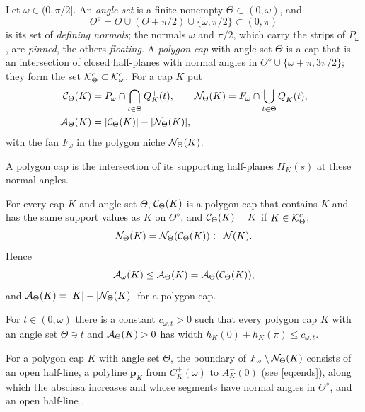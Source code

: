\begin{definition}\label{def:polygon}
Let $\omega\in(0,\pi/2]$. An \emph{angle set} is a finite nonempty
$\Theta\subset(0,\omega)$, and
\[
  \Theta^\diamond=\Theta\cup(\Theta+\pi/2)\cup\{\omega,\pi/2\}\subset(0,\pi)
\]
is its set of \emph{defining normals}; the normals $\omega$ and $\pi/2$, which
carry the strips of $P_\omega$, are \emph{pinned}, the others \emph{floating}. A
\emph{polygon cap} with angle set $\Theta$ is a cap that is an intersection of
closed half-planes with normal angles in
$\Theta^\diamond\cup\{\omega+\pi,3\pi/2\}$; they form the set
$\mathcal{K}^{\mathrm{c}}_\Theta\subset\mathcal{K}^{\mathrm{c}}_\omega$. For a cap $K$ put
\begin{align*}
  \mathcal{C}_\Theta(K)&=P_\omega\cap\bigcap_{t\in\Theta}Q_K^+(t),\qquad
  \mathcal{N}_\Theta(K)=F_\omega\cap\bigcup_{t\in\Theta}Q_K^-(t),\\
  \mathcal{A}_\Theta(K)&=\lvert \mathcal{C}_\Theta(K)\rvert-\lvert \mathcal{N}_\Theta(K)\rvert ,
\end{align*}
with the fan $F_\omega$ in the polygon niche $\mathcal{N}_\Theta(K)$.
\end{definition}

A polygon cap is the intersection of its supporting half-planes $H_K(s)$ at
these normal angles.

\begin{fact}\label{fact:polygon}
For every cap $K$ and angle set $\Theta$, $\mathcal{C}_\Theta(K)$ is a polygon cap that
contains $K$ and has the same support values as $K$ on $\Theta^\diamond$, and
$\mathcal{C}_\Theta(K)=K$ if $K\in\mathcal{K}^{\mathrm{c}}_\Theta$;
\[
  \mathcal{N}_\Theta(K)=\mathcal{N}_\Theta(\mathcal{C}_\Theta(K))\subset\mathcal{N}(K).
\]
Hence
\[
  \mathcal{A}_\omega(K)\le\mathcal{A}_\Theta(K)=\mathcal{A}_\Theta(\mathcal{C}_\Theta(K)),
\]
and $\mathcal{A}_\Theta(K)=\lvert K\rvert-\lvert \mathcal{N}_\Theta(K)\rvert$ for a polygon cap.
\end{fact}

\begin{fact}\label{fact:width}
For $t\in(0,\omega)$ there is a constant $c_{\omega,t}>0$ such that every
polygon cap $K$ with an angle set $\Theta\ni t$ and $\mathcal{A}_\Theta(K)>0$ has width
$h_K(0)+h_K(\pi)\le c_{\omega,t}$. 
\end{fact}

For a polygon cap $K$ with angle set $\Theta$, the boundary of
$F_\omega\setminus\mathcal{N}_\Theta(K)$ consists of an open half-line, a polyline
$\mathbf p_K$ from $C_K^+(\omega)$ to $A_K^-(0)$ (see \eqref{eq:ends}), along
which the abscissa increases and whose segments have normal angles in
$\Theta^\diamond$, and an open half-line .

